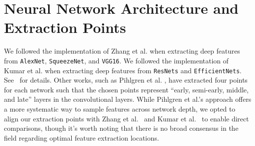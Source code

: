 \documentclass[sigconf]{acmart}
\begin{document}


\appendix 
\onecolumn

\section{Neural Network Architecture and Extraction Points}
\label{sec:extraction_points}

We followed the implementation of Zhang et al. \cite{zhangUnreasonableEffectivenessDeep2018} when extracting deep features from \texttt{AlexNet}, \texttt{SqueezeNet}, and \texttt{VGG16}. We followed the implementation of Kumar et al. \cite{kumarBetterImageNetClassifiers2022} when extracting deep features from \texttt{ResNets} and \texttt{EfficientNets}. See~ for details. Other works, such as Pihlgren et al. \cite{pihlgren2023systematic}, have extracted four points for each network such that the chosen points represent ``early, semi-early, middle, and late'' layers in the convolutional layers. While Pihlgren et al.'s approach offers a more systematic way to sample features across network depth, we opted to align our extraction points with Zhang et al.~\cite{zhangUnreasonableEffectivenessDeep2018} and Kumar et al.~\cite{kumarBetterImageNetClassifiers2022} to enable direct comparisons, though it's worth noting that there is no broad consensus in the field regarding optimal feature extraction locations.
\end{document}
